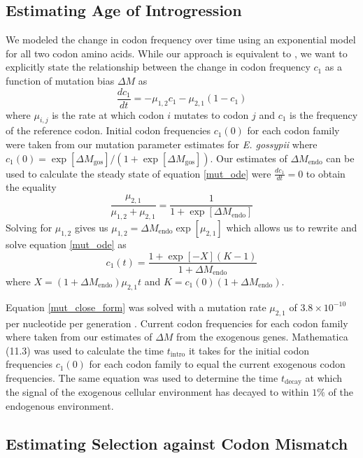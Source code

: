 \documentclass[doublespacing,linenumbers]{bmcart}
\newcommand{\gossypii}{\textit{E. gossypii}\xspace}
\newcommand{\DM}{\ensuremath{{\Delta M}}\xspace}
\begin{document}
\subsection*{Estimating Age of Introgression}
We modeled the change in codon frequency over time using an exponential model for all two codon amino acids.
While our approach is equivalent to \cite{MaraisEtal2004}, we want to explicitly state the relationship between the change in codon frequency $c_1$ as a function of mutation bias \DM as
\begin{equation}
\frac{d c_1}{d t} = -\mu_{1,2}c_1 - \mu_{2,1}(1-c_1)
\label{mut_ode}
\end{equation}
where $\mu_{i,j}$ is the rate at which codon $i$ mutates to codon $j$ and $c_1$ is the frequency of the reference codon.
Initial codon frequencies $c_1(0)$ for each codon family were taken from our mutation parameter estimates for \gossypii where $c_1(0) = \exp[\DM_\text{gos}]/(1+\exp[\DM_\text{gos}])$. 
Our estimates of $\DM_\text{endo}$ can be used to calculate the steady state of equation \ref{mut_ode} were $\frac{d c_1}{d t} = 0$ to obtain the equality
\begin{equation}
\frac{\mu_{2,1}}{\mu_{1,2} + \mu_{2,1}} = \frac{1}{1+\exp[\DM_\text{endo}]}
\end{equation}
Solving for $\mu_{1,2}$ gives us $\mu_{1,2} = \DM_\text{endo}\exp[\mu_{2,1}]$ which allows us to rewrite and solve equation \ref{mut_ode} as
\begin{equation}
c_1(t) = \frac{ 1 + \exp[-X](K-1) }{ 1+\DM_\text{endo} }
\label{mut_close_form}
\end{equation}
where $X = (1+\DM_\text{endo})\mu_{2,1}t$ and $K = c_1(0)(1+\DM_\text{endo}) $.

Equation \ref{mut_close_form} was solved with a mutation rate $\mu_{2,1}$ of $3.8\times 10^{-10}$ per nucleotide per generation \citep{lang2008}. 
Current codon frequencies for each codon family where taken from our estimates of \DM from the exogenous genes.
Mathematica (11.3) \citep{Mathematica11} was used to calculate the time $t_\text{intro}$ it takes for the initial codon frequencies $c_1(0)$ for each codon family to equal the current exogenous codon frequencies.
The same equation was used to determine the time $t_\text{decay}$ at which the signal of the exogenous cellular environment has decayed to within $1 \%$ of the endogenous environment.

\subsection*{Estimating Selection against Codon Mismatch}
\end{document}
